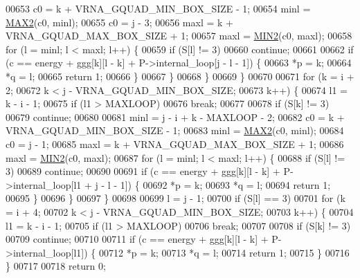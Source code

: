 \begin{DoxyCode}
00653       c0    = k + VRNA\_GQUAD\_MIN\_BOX\_SIZE - 1;
00654       minl  = \hyperlink{group__utils_ga33297b3679c713b0c4d897cd0fe3b122}{MAX2}(c0, minl);
00655       c0    = j - 3;
00656       maxl  = k + VRNA\_GQUAD\_MAX\_BOX\_SIZE + 1;
00657       maxl  = \hyperlink{group__utils_gae0b9cd0ce090bd69b951aa73e8fa4f7d}{MIN2}(c0, maxl);
00658       \textcolor{keywordflow}{for} (l = minl; l < maxl; l++) \{
00659         \textcolor{keywordflow}{if} (S[l] != 3)
00660           \textcolor{keywordflow}{continue};
00661 
00662         \textcolor{keywordflow}{if} (c == energy + ggg[k][l - k] + P->internal\_loop[j - l - 1]) \{
00663           *p  = k;
00664           *q  = l;
00665           \textcolor{keywordflow}{return} 1;
00666         \}
00667       \}
00668     \}
00669   \}
00670 
00671   \textcolor{keywordflow}{for} (k = i + 2;
00672        k < j - VRNA\_GQUAD\_MIN\_BOX\_SIZE;
00673        k++) \{
00674     l1 = k - i - 1;
00675     \textcolor{keywordflow}{if} (l1 > MAXLOOP)
00676       \textcolor{keywordflow}{break};
00677 
00678     \textcolor{keywordflow}{if} (S[k] != 3)
00679       \textcolor{keywordflow}{continue};
00680 
00681     minl  = j - i + k - MAXLOOP - 2;
00682     c0    = k + VRNA\_GQUAD\_MIN\_BOX\_SIZE - 1;
00683     minl  = \hyperlink{group__utils_ga33297b3679c713b0c4d897cd0fe3b122}{MAX2}(c0, minl);
00684     c0    = j - 1;
00685     maxl  = k + VRNA\_GQUAD\_MAX\_BOX\_SIZE + 1;
00686     maxl  = \hyperlink{group__utils_gae0b9cd0ce090bd69b951aa73e8fa4f7d}{MIN2}(c0, maxl);
00687     \textcolor{keywordflow}{for} (l = minl; l < maxl; l++) \{
00688       \textcolor{keywordflow}{if} (S[l] != 3)
00689         \textcolor{keywordflow}{continue};
00690 
00691       \textcolor{keywordflow}{if} (c == energy + ggg[k][l - k] + P->internal\_loop[l1 + j - l - 1]) \{
00692         *p  = k;
00693         *q  = l;
00694         \textcolor{keywordflow}{return} 1;
00695       \}
00696     \}
00697   \}
00698 
00699   l = j - 1;
00700   \textcolor{keywordflow}{if} (S[l] == 3)
00701     \textcolor{keywordflow}{for} (k = i + 4;
00702          k < j - VRNA\_GQUAD\_MIN\_BOX\_SIZE;
00703          k++) \{
00704       l1 = k - i - 1;
00705       \textcolor{keywordflow}{if} (l1 > MAXLOOP)
00706         \textcolor{keywordflow}{break};
00707 
00708       \textcolor{keywordflow}{if} (S[k] != 3)
00709         \textcolor{keywordflow}{continue};
00710 
00711       \textcolor{keywordflow}{if} (c == energy + ggg[k][l - k] + P->internal\_loop[l1]) \{
00712         *p  = k;
00713         *q  = l;
00714         \textcolor{keywordflow}{return} 1;
00715       \}
00716     \}
00717 
00718   \textcolor{keywordflow}{return} 0;

\end{DoxyCode}
